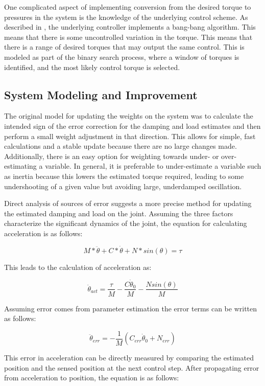 \documentclass[letterpaper, 10 pt, conference]{IEEEconf} %
\newcommand{\bbss}[1]{\subsection{#1}}
\begin{document}
One complicated aspect of implementing conversion from the desired torque to 
pressures in the system is the
knowledge of the underlying control scheme. As described in \cite{HuntPMuscles},
the underlying controller implements a bang-bang algorithm. This means that 
there is some uncontrolled variation in the torque. This means that there is a
range of desired torques that may output the same control. This is modeled as
part of the binary search process, where a window of torques is identified, and
the most likely control torque is selected.

\bbss{System Modeling and Improvement}
\label{sec:systemImprovement}

The original model for updating the weights on the system was to calculate the
intended sign of the error correction for the damping and load estimates and 
then perform a small weight adjustment in that direction. This allows for 
simple, fast calculations and a stable update because there are no large 
changes made. Additionally, there is an easy option for weighting towards 
under- or over-estimating a variable. In general, it is preferable to 
under-estimate a variable such as inertia because this lowers the estimated 
torque required, leading to some undershooting of a given value but avoiding
large, underdamped oscillation.

Direct analysis of sources of error suggests a more precise method for updating
the estimated damping and load on the joint. Assuming the three factors characterize the significant dynamics of the joint, the equation for calculating acceleration is as follows:

\begin{equation}
M * \ddot{\theta} + C * \dot{\theta} + N * sin(\theta) = \tau
\end{equation}

This leads to the calculation of acceleration as:

\begin{equation}
\ddot{\theta}_{act} = \dfrac{\tau}{M} - \dfrac{C \dot{\theta}_{0}}{M} - \dfrac{N sin(\theta)}{M}
\end{equation}

Assuming error comes from parameter estimation the error terms can be written as
follows:

\begin{equation}
\ddot{\theta}_{err} = - \dfrac{1}{M}
(C_{err} \dot{\theta}_{0} + N_{err})
\end{equation}

This error in acceleration can be directly measured by comparing the estimated
position and the sensed position at the next control step. After propagating error from acceleration to position, the equation is as follows:
\end{document}
